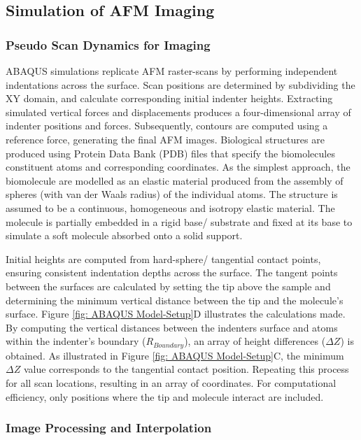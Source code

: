 \subsection{Simulation of AFM Imaging}

\subsubsection{Pseudo Scan Dynamics for Imaging}

ABAQUS simulations replicate AFM raster-scans by performing independent indentations across the surface. Scan positions are determined by subdividing the XY domain, and calculate corresponding initial indenter heights. Extracting simulated vertical forces and displacements produces a four-dimensional array of indenter positions and forces. Subsequently, contours are computed using a reference force, generating the final AFM images. Biological structures are produced using Protein Data Bank (PDB) files that specify the biomolecules constituent atoms and corresponding coordinates. As the simplest approach, the biomolecule are modelled as an elastic material produced from the assembly of spheres (with van der Waals radius) of the individual atoms. The structure is assumed to be a continuous, homogeneous and isotropy elastic material. The molecule is partially embedded in a rigid base/ substrate and fixed at its base to simulate a soft molecule absorbed onto a solid support. 

Initial heights are computed from hard-sphere/ tangential contact points, ensuring consistent indentation depths across the surface. The tangent points between the surfaces are calculated by setting the tip above the sample and determining the minimum vertical distance between the tip and the molecule's surface. Figure \ref{fig: ABAQUS Model-Setup}D illustrates the calculations made. By computing the vertical distances between the indenters surface and atoms within the indenter's boundary ($R_{Boundary}$), an array of height differences ($\Delta Z$) is obtained. As illustrated in Figure \ref{fig: ABAQUS Model-Setup}C, the minimum $\Delta Z$ value corresponds to the tangential contact position. Repeating this process for all scan locations, resulting in an array of coordinates. For computational efficiency, only positions where the tip and molecule interact are included.



\subsubsection{Image Processing and Interpolation}

